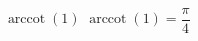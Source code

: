  {$\operatorname{arccot} \left( 1 \right)$ }
{ $\operatorname{arccot} \left( 1 \right) = \dfrac{\pi}{4}$}
